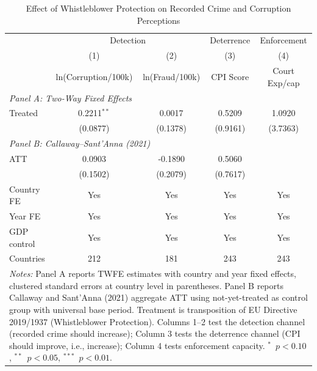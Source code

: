 \begin{table}[htbp]
\centering
\caption{Effect of Whistleblower Protection on Recorded Crime and Corruption Perceptions}
\label{tab:main}
\begin{tabular}{lcccc}
\hline\hline
 & \multicolumn{2}{c}{Detection} & Deterrence & Enforcement \\
\cmidrule(lr){2-3} \cmidrule(lr){4-4} \cmidrule(lr){5-5}
 & (1) & (2) & (3) & (4) \\
 & ln(Corruption/100k) & ln(Fraud/100k) & CPI Score & Court Exp/cap \\
\hline
\multicolumn{5}{l}{\textit{Panel A: Two-Way Fixed Effects}} \\[3pt]
Treated & 0.2211$^{**}$ & 0.0017 & 0.5209 & 1.0920 \\
 & (0.0877) & (0.1378) & (0.9161) & (3.7363) \\
\hline
\multicolumn{5}{l}{\textit{Panel B: Callaway--Sant'Anna (2021)}} \\[3pt]
ATT & 0.0903 & -0.1890 & 0.5060 & \\
 & (0.1502) & (0.2079) & (0.7617) & \\
\hline
Country FE & Yes & Yes & Yes & Yes \\
Year FE & Yes & Yes & Yes & Yes \\
GDP control & Yes & Yes & Yes & Yes \\
Countries & 212 & 181 & 243 & 243 \\
\hline\hline
\multicolumn{5}{p{0.95\textwidth}}{\footnotesize \textit{Notes:} Panel A reports TWFE estimates with country and year fixed effects, clustered standard errors at country level in parentheses. Panel B reports Callaway and Sant'Anna (2021) aggregate ATT using not-yet-treated as control group with universal base period. Treatment is transposition of EU Directive 2019/1937 (Whistleblower Protection). Columns 1--2 test the detection channel (recorded crime should increase); Column 3 tests the deterrence channel (CPI should improve, i.e., increase); Column 4 tests enforcement capacity. $^{*}$~$p<0.10$, $^{**}$~$p<0.05$, $^{***}$~$p<0.01$.} \\
\end{tabular}
\end{table}

